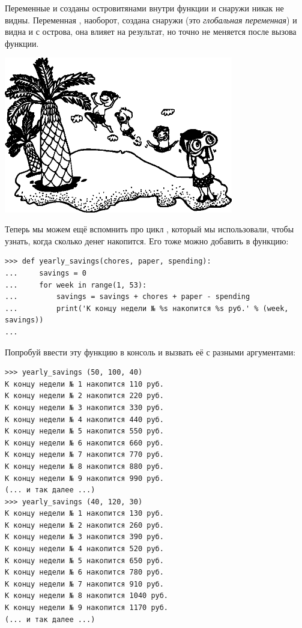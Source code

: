 Переменные  и  созданы островитянами внутри функции и снаружи никак не видны. Переменная , наоборот, создана снаружи (это \emph{глобальная переменная}) и видна и с острова, она влияет на результат, но точно не меняется после вызова функции.

\begin{center}
\includegraphics*[width=100mm]{../en/islanders.eps}
\end{center}

Теперь мы можем ещё вспомнить про цикл , который мы использовали, чтобы узнать, когда сколько денег накопится. Его тоже можно добавить в функцию:

\begin{listing}
\begin{verbatim}
>>> def yearly_savings(chores, paper, spending):
...     savings = 0
...     for week in range(1, 53):
...         savings = savings + chores + paper - spending
...         print('К концу недели № %s накопится %s руб.' % (week, savings))
...
\end{verbatim}
\end{listing}

Попробуй ввести эту функцию в консоль и вызвать её с разными аргументами:

\begin{listing}
\begin{verbatim}
>>> yearly_savings (50, 100, 40)
К концу недели № 1 накопится 110 руб.
К концу недели № 2 накопится 220 руб.
К концу недели № 3 накопится 330 руб.
К концу недели № 4 накопится 440 руб.
К концу недели № 5 накопится 550 руб.
К концу недели № 6 накопится 660 руб.
К концу недели № 7 накопится 770 руб.
К концу недели № 8 накопится 880 руб.
К концу недели № 9 накопится 990 руб.
(... и так далее ...)
>>> yearly_savings (40, 120, 30)
К концу недели № 1 накопится 130 руб.
К концу недели № 2 накопится 260 руб.
К концу недели № 3 накопится 390 руб.
К концу недели № 4 накопится 520 руб.
К концу недели № 5 накопится 650 руб.
К концу недели № 6 накопится 780 руб.
К концу недели № 7 накопится 910 руб.
К концу недели № 8 накопится 1040 руб.
К концу недели № 9 накопится 1170 руб.
(... и так далее ...)
\end{verbatim}
\end{listing}

